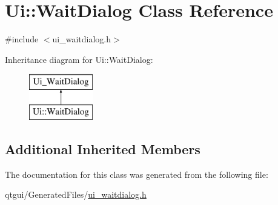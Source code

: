 \hypertarget{class_ui_1_1_wait_dialog}{}\section{Ui\+::Wait\+Dialog Class Reference}
\label{class_ui_1_1_wait_dialog}


{\ttfamily \#include $<$ui\+\_\+waitdialog.\+h$>$}

Inheritance diagram for Ui\+::Wait\+Dialog\+:\begin{figure}[H]
\begin{center}
\leavevmode
\includegraphics[height=2.000000cm]{d0/d20/class_ui_1_1_wait_dialog}
\end{center}
\end{figure}
\subsection*{Additional Inherited Members}


The documentation for this class was generated from the following file\+:\begin{DoxyCompactItemize}
\item 
qtgui/\+Generated\+Files/\mbox{\hyperlink{ui__waitdialog_8h}{ui\+\_\+waitdialog.\+h}}\end{DoxyCompactItemize}

